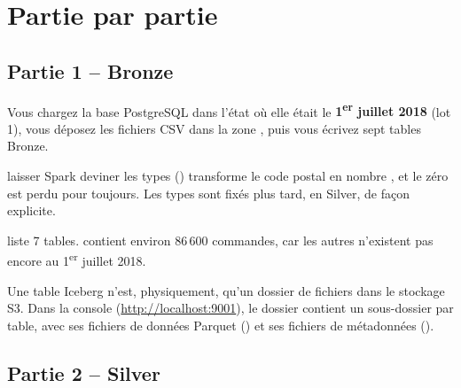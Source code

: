 \section{Partie par partie}

\subsection*{Partie 1 -- Bronze \hfill {}}

Vous chargez la base PostgreSQL dans l'état où elle était le \textbf{1\textsuperscript{er} juillet 2018}
(lot 1), vous déposez les fichiers CSV dans la zone , puis vous écrivez sept tables Bronze.

\begin{notion}
laisser Spark deviner les types ()
transforme le code postal  en nombre , et le zéro est perdu pour toujours.
Les types sont fixés plus tard, en Silver, de façon explicite.
\end{notion}

\begin{resultat}
 liste 7 tables.  contient environ
86\,600 commandes, car les autres n'existent pas encore au 1\textsuperscript{er} juillet 2018.
\end{resultat}


Une table Iceberg n'est, physiquement, qu'un dossier de fichiers dans le stockage S3.
Dans la console (\url{http://localhost:9001}), le dossier  contient
un sous-dossier par table, avec ses fichiers de données Parquet () et ses fichiers de
métadonnées ().



\subsection*{Partie 2 -- Silver \hfill {}}

